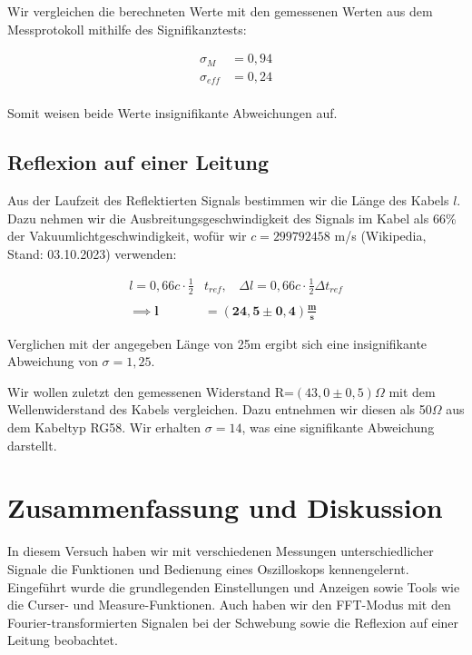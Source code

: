 \documentclass{article}
\begin{document}
Wir vergleichen die berechneten Werte mit den gemessenen Werten aus dem Messprotokoll mithilfe des Signifikanztests:

\begin{equation}
    \begin{split}
        \sigma_M &= 0,94\\
        \sigma_{eff} &= 0,24 \\
    \end{split}
\end{equation}

Somit weisen beide Werte insignifikante Abweichungen auf.

\newpage

\subsection{Reflexion auf einer Leitung}

Aus der Laufzeit des Reflektierten Signals bestimmen wir die Länge des Kabels $l$. Dazu nehmen wir die Ausbreitungsgeschwindigkeit des Signals im Kabel als 66\% der Vakuumlichtgeschwindigkeit, wofür wir $c = 299792458$ m/s (Wikipedia, Stand: 03.10.2023) verwenden:

\begin{equation}
    \begin{split}
        l = 0,66 c \cdot \frac{1}{2} & t_{ref}, \ \  \ \ \Delta l = 0,66 c \cdot \frac{1}{2} \Delta t_{ref} \\ \\
        \implies \bm{l} &= \bm{(24,5 \pm 0,4) \frac{\textbf{m}}{\textbf{s}}}  
    \end{split}
\end{equation}

Verglichen mit der angegeben Länge von 25m ergibt sich eine insignifikante Abweichung von $\sigma = 1,25$.

Wir wollen zuletzt den gemessenen Widerstand R=$(43,0 \pm 0,5) \Omega$ mit dem Wellenwiderstand des Kabels vergleichen. Dazu entnehmen wir diesen als 50$\Omega$ aus dem Kabeltyp RG58. Wir erhalten $\sigma = 14$, was eine signifikante Abweichung darstellt.

\newpage
\section{Zusammenfassung und Diskussion}

In diesem Versuch haben wir mit verschiedenen Messungen unterschiedlicher Signale die Funktionen und Bedienung eines Oszilloskops kennengelernt. Eingeführt wurde die grundlegenden Einstellungen und Anzeigen sowie Tools wie die Curser- und Measure-Funktionen. Auch haben wir den FFT-Modus mit den Fourier-transformierten Signalen bei der Schwebung sowie die Reflexion auf einer Leitung beobachtet. 
\end{document}
